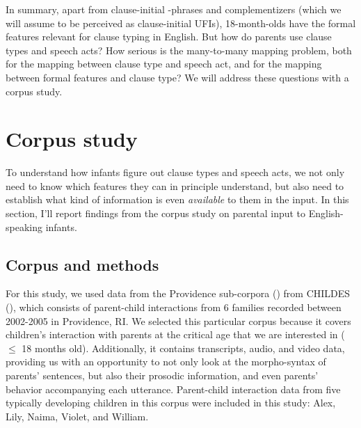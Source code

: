 In summary, apart from clause-initial \twh-phrases and complementizers (which we will assume to be perceived as clause-initial UFIs), 18-month-olds have the formal features relevant for clause typing in English. But how do parents use clause types and speech acts? How serious is the many-to-many mapping problem, both for the mapping between clause type and speech act, and for the mapping between formal features and clause type? We will address these questions with a corpus study. %

\section{Corpus study}
\label{sec:engcl:corpus}
To understand how infants figure out clause types and speech acts, we not only need to know which features they can in principle understand, but also need to establish what kind of information is even \emph{available} to them in the input. In this section, I’ll report findings from the corpus study on parental input to English-speaking infants. 


\subsection{Corpus and methods}
\label{sec:engcl:corpus:methods}
For this study, we used data from the Providence sub-corpora (\cite{ProvidenceCorpus}) from CHILDES (\cite{CHILDES}), which consists of parent-child interactions from 6 families recorded between 2002-2005 in Providence, RI. We selected this particular corpus because it covers children’s interaction with parents at the critical age that we are interested in ($\leq$ 18 months old). Additionally, it contains transcripts, audio, and video data, providing us with an opportunity to not only look at the morpho-syntax of parents’ sentences, but also their prosodic information, and even parents’ behavior accompanying each utterance. Parent-child interaction data from five typically developing children in this corpus were included in this study: Alex, Lily, Naima, Violet, and William. %


